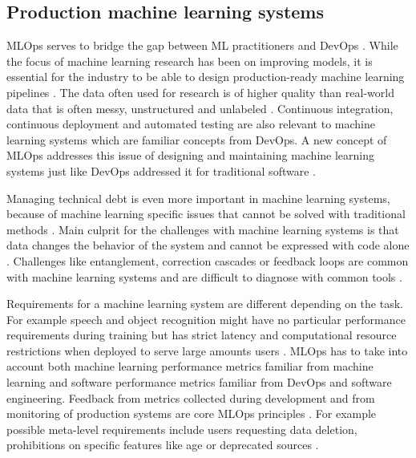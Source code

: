 \subsection{Production machine learning systems}


MLOps serves to bridge the gap between ML practitioners and DevOps \parencite{moreschiEndtoEndMLOpsTools2023}. While the focus of machine learning research has been on improving models, it is essential for the industry to be able to design production-ready machine learning pipelines \parencite{posoldovaMachineLearningPipelines2020}. The data often used for research is of higher quality than real-world data that is often messy, unstructured and unlabeled \parencite{posoldovaMachineLearningPipelines2020}. Continuous integration, continuous deployment and automated testing are also relevant to machine learning systems \parencite{posoldovaMachineLearningPipelines2020} which are familiar concepts from DevOps. A new concept of MLOps addresses this issue of designing and maintaining machine learning systems just like DevOps addressed it for traditional software \parencite{kreuzbergerMachineLearningOperations2023}.

Managing technical debt is even more important in machine learning systems, because of machine learning specific issues that cannot be solved with traditional methods \parencite{sculleyHiddenTechnicalDebt2015a}. Main culprit for the challenges with machine learning systems is that data changes the behavior of the system and cannot be expressed with code alone \parencite{sculleyHiddenTechnicalDebt2015a}. Challenges like entanglement, correction cascades or feedback loops are common with machine learning systems and are difficult to diagnose with common tools \parencite{sculleyHiddenTechnicalDebt2015a}.

Requirements for a machine learning system are different depending on the task. For example speech and object recognition might have no particular performance requirements during training but has strict latency and computational resource restrictions when deployed to serve large amounts users \parencite{hintonDistillingKnowledgeNeural2015}. MLOps has to take into account both machine learning performance metrics familiar from machine learning and software performance metrics familiar from DevOps and software engineering. Feedback from metrics collected during development and from monitoring of production systems are core MLOps principles \parencite{kreuzbergerMachineLearningOperations2023}. For example possible meta-level requirements include users requesting data deletion, prohibitions on specific features like age or deprecated sources \parencite{breckMLTestScore2017a}.


